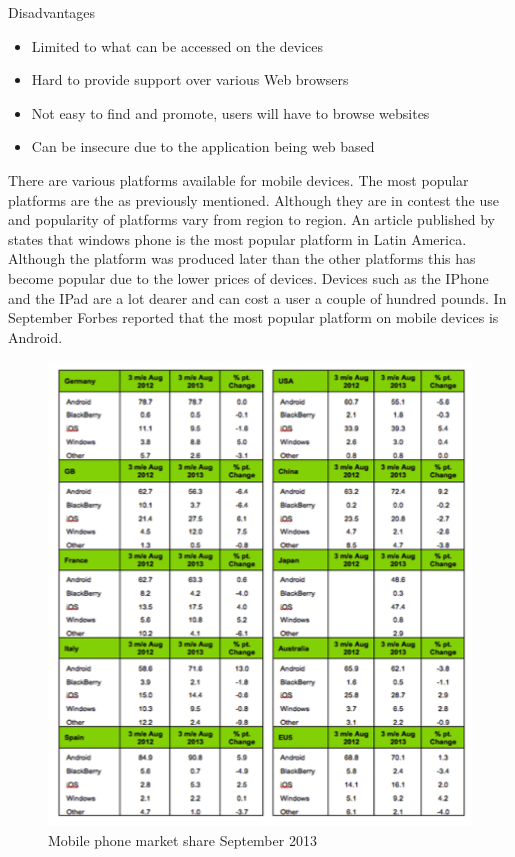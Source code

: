 Disadvantages
\begin{itemize}
    \item Limited to what can be accessed on the devices 
    \item Hard to provide support over various Web browsers
    \item Not easy to find and promote, users will have to browse websites 
    \item Can be insecure due to the application being web based 
\end{itemize}

There are various platforms available for mobile devices. The most popular platforms are the as previously mentioned. Although they are in contest the use and popularity of platforms vary from region to region. An article published by \citet{wpcentral13} states that windows phone is the most popular platform in Latin America. Although the platform was produced later than the other platforms this has become popular due to the lower prices of devices. Devices such as the IPhone and the IPad are a lot dearer and can cost a user a couple of hundred pounds. In September Forbes reported that the most popular platform on mobile devices is Android. 

\newpage
\begin{figure}[!ht]
    \includegraphics[width=\linewidth]{research/mobile_platforms/forbeslist13.png}
    \caption{Mobile phone market share September 2013}
\end{figure}

